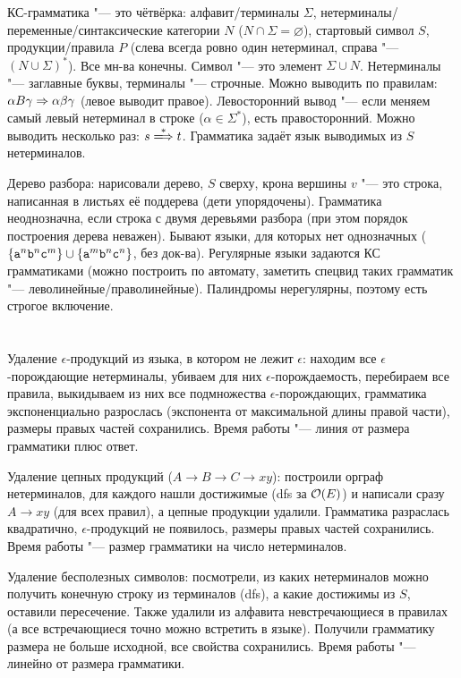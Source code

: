 \section{} %
	КС-грамматика "--- это чётвёрка: алфавит/терминалы $\Sigma$, нетерминалы/переменные/синтаксические категории $N$ ($N \cap \Sigma=\varnothing$),
	стартовый символ $S$, продукции/правила $P$ (слева всегда ровно один нетерминал, справа "--- $(N\cup\Sigma)^*$).
	Все мн-ва конечны.
	Символ "--- это элемент $\Sigma \cup N$.
	Нетерминалы "--- заглавные буквы, терминалы "--- строчные.
	Можно выводить по правилам: $\alpha B \gamma \Rightarrow \alpha\beta\gamma$ (левое выводит правое).
	Левосторонний вывод "--- если меняем самый левый нетерминал в строке ($\alpha \in \Sigma^*$), есть правосторонний.
	Можно выводить несколько раз: $s \xLongrightarrow{*} t$.
	Грамматика задаёт язык выводимых из $S$ нетерминалов.

	Дерево разбора: нарисовали дерево, $S$ сверху, крона вершины $v$ "--- это строка, написанная в листьях её поддерева (дети упорядочены).
	Грамматика неоднозначна, если строка с двумя деревьями разбора (при этом порядок построения дерева неважен).
	Бывают языки, для которых нет однозначных ($\{\t{a}^n\t{b}^n\t{c}^m\}\cup\{\t{a}^m\t{b}^n\t{c}^n\}$, без док-ва).
	Регулярные языки задаются КС грамматиками (можно построить по автомату, заметить спецвид таких грамматик "--- леволинейные/праволинейные).
	Палиндромы нерегулярны, поэтому есть строгое включение.

\section{} %
	Удаление $\epsilon$-продукций из языка, в котором не лежит $\epsilon$: находим все $\epsilon$-порождающие нетерминалы,
	убиваем для них $\epsilon$-порождаемость, перебираем все правила, выкидываем из них все подмножества $\epsilon$-порождающих,
	грамматика экспоненциально разрослась (экспонента от максимальной длины правой части), размеры правых частей сохранились.
	Время работы "--- линия от размера грамматики плюс ответ.

	Удаление цепных продукций ($A \to B \to C \to xy$): построили орграф нетерминалов,
	для каждого нашли достижимые (dfs за $\mathcal O(E)$) и написали сразу $A \to xy$ (для всех правил), а цепные продукции удалили.
	Грамматика разраслась квадратично, $\epsilon$-продукций не появилось, размеры правых частей сохранились.
	Время работы "--- размер грамматики на число нетерминалов.

	Удаление бесполезных символов: посмотрели, из каких нетерминалов можно получить конечную строку из терминалов (dfs),
	а какие достижимы из $S$, оставили пересечение.
	Также удалили из алфавита невстречающиеся в правилах (а все встречающиеся точно можно встретить в языке).
	Получили грамматику размера не больше исходной, все свойства сохранились.
	Время работы "--- линейно от размера грамматики.


